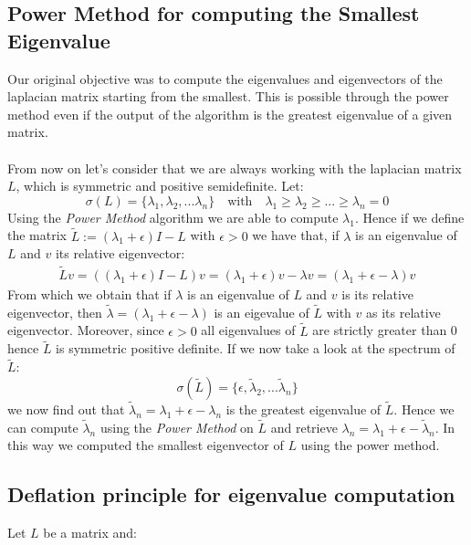   \subsection*{Power Method for computing the Smallest Eigenvalue}
  Our original objective was to compute the eigenvalues and eigenvectors of the laplacian matrix starting from the smallest. This is possible through the power method even if the output of the algorithm is the greatest eigenvalue of a given matrix. \\
  \\
  From now on let's consider that we are always working with the laplacian matrix \(L\), which is symmetric and positive semidefinite. Let:
  \[
  \sigma(L) = \{\lambda_1, \lambda_2, ... \lambda_n\} \quad \text{with}  \quad \lambda_1 \geq \lambda_2 \geq ... \geq \lambda_n = 0 
  \]
  Using the \textit{Power Method} algorithm we are able to compute \(\lambda_1\). Hence if we define the matrix \(\tilde{L} := (\lambda_1 + \epsilon) I - L\) with \(\epsilon > 0\) we have that, if \(\lambda\) is an eigenvalue of \(L\) and \(v\) its relative eigenvector:
  \begin{eqnarray}
    \tilde{L}v = \left((\lambda_1 + \epsilon) I - L\right)v = (\lambda_1 + \epsilon)v - \lambda v = (\lambda_1 + \epsilon - \lambda ) v
  \end{eqnarray}
  From which we obtain that if \(\lambda\) is an eigenvalue of \(L\) and \(v\) is its relative eigenvector, then \(\tilde{\lambda} = (\lambda_1 + \epsilon - \lambda)\) is an eigevalue of \(\tilde{L}\) with \(v\) as its relative eigenvector. Moreover, since \(\epsilon>0\) all eigenvalues of \(\tilde{L}\) are strictly greater than 0 hence \(\tilde{L}\) is symmetric positive definite. If we now take a look at the spectrum of \(\tilde{L}\):
  \begin{equation}
    \sigma(\tilde{L}) = \{ \epsilon , \tilde{\lambda}_2, ... \tilde{\lambda}_n\}
  \end{equation}
  we now find out that \(\tilde{\lambda}_n = \lambda_1 + \epsilon - \lambda_n\) is the greatest eigenvalue of \(\tilde{L}\). Hence we can compute \(\tilde{\lambda}_n\) using the \textit{Power Method} on \(\tilde{L}\) and retrieve \(\lambda_n = \lambda_1 + \epsilon - \tilde{\lambda}_n \). In this way we computed the smallest eigenvector of \(L\) using the power method.

  \subsection*{Deflation principle for eigenvalue computation}
  Let \(L\) be a matrix and:

